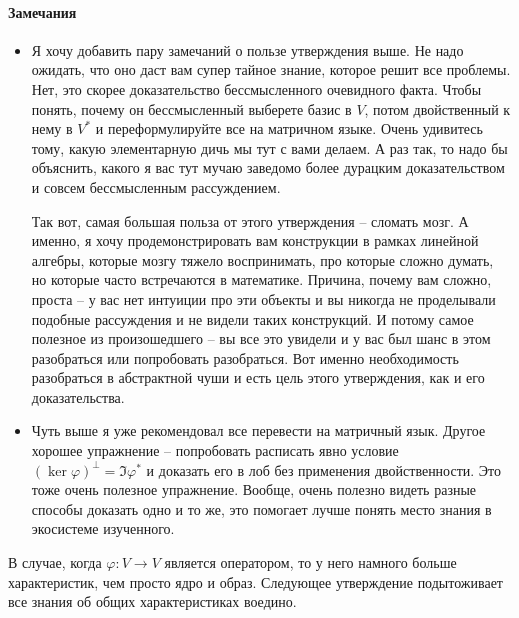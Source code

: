 \paragraph{Замечания}
\begin{itemize}
\item Я хочу добавить пару замечаний о пользе утверждения выше.
Не надо ожидать, что оно даст вам супер тайное знание, которое решит все проблемы.
Нет, это скорее доказательство бессмысленного очевидного факта.
Чтобы понять, почему он бессмысленный выберете базис в $V$, потом двойственный к нему в $V^*$ и переформулируйте все на матричном языке.
Очень удивитесь тому, какую элементарную дичь мы тут с вами делаем.
А раз так, то надо бы объяснить, какого я вас тут мучаю заведомо более дурацким доказательством и совсем бессмысленным рассуждением.

Так вот, самая большая польза от этого утверждения -- сломать мозг.
А именно, я хочу продемонстрировать вам конструкции в рамках линейной алгебры, которые мозгу тяжело воспринимать, про которые сложно думать, но которые часто встречаются в математике.
Причина, почему вам сложно, проста -- у вас нет интуиции про эти объекты и вы никогда не проделывали подобные рассуждения и не видели таких конструкций.
И потому самое полезное из произошедшего -- вы все это увидели и у вас был шанс в этом разобраться или попробовать разобраться.
Вот именно необходимость разобраться в абстрактной чуши и есть цель этого утверждения, как и его доказательства.

\item Чуть выше я уже рекомендовал все перевести на матричный язык.
Другое хорошее упражнение -- попробовать расписать явно условие $(\ker \varphi)^\bot = \Im \varphi^*$ и доказать его в лоб без применения двойственности.
Это тоже очень полезное упражнение.
Вообще, очень полезно видеть разные способы доказать одно и то же, это помогает лучше понять место знания в экосистеме изученного.
\end{itemize}

В случае, когда $\varphi\colon V\to V$ является оператором, то у него намного больше характеристик, чем просто ядро и образ.
Следующее утверждение подытоживает все знания об общих характеристиках воедино.

